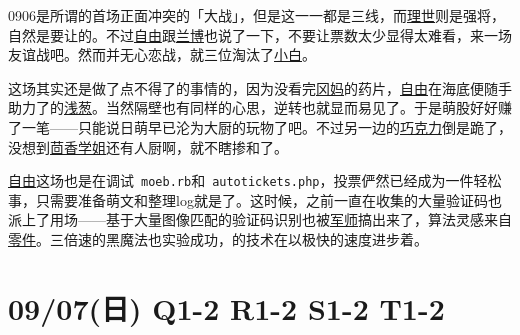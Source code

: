 
0906是所谓的首场正面冲突的「大战」，但是这一一都是三线，而\uline{理世}则是强将，自然是要让的。不过\uline{自由}跟\uline{兰博}也说了一下，不要让票数太少显得太难看，来一场友谊战吧。然而并无心恋战，就三位淘汰了\uline{小白}。

这场其实还是做了点不得了的事情的，因为没看完\uline{冈妈}的药片，\uline{自由}在海底便随手助力了的\uline{浅葱}。当然隔壁也有同样的心思，逆转也就显而易见了。于是萌股好好赚了一笔——只能说日萌早已沦为大厨的玩物了吧。不过另一边的\uline{巧克力}倒是跪了，没想到\uline{茴香学姐}还有人厨啊，就不瞎掺和了。

\uline{自由}这场也是在调试~\verb=moeb.rb=和~\verb=autotickets.php=，投票俨然已经成为一件轻松事，只需要准备萌文和整理log就是了。这时候，之前一直在收集的大量验证码也派上了用场——基于大量图像匹配的验证码识别也被\uline{军师}搞出来了，算法灵感来自\uline{零件}。三倍速的黑魔法也实验成功，的技术在以极快的速度进步着。

\section{09/07(日) Q1-2 R1-2 S1-2 T1-2}

